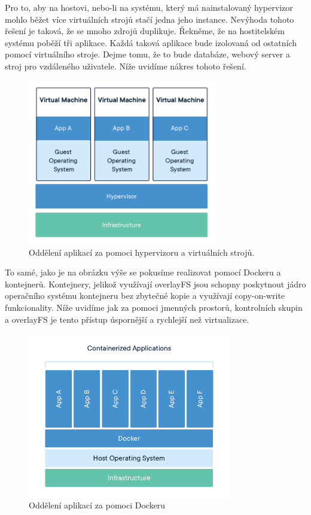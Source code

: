 Pro to, aby na hostovi, nebo-li na systému, který má nainstalovaný hypervizor mohlo běžet více virtuálních strojů stačí jedna jeho instance. Nevýhoda tohoto řešení je taková, že se mnoho zdrojů duplikuje. Řekněme, že na hostitelském systému poběží tři aplikace. Každá taková aplikace bude izolovaná od ostatních pomocí virtuálního stroje. Dejme tomu, že to bude databáze, webový server a stroj pro vzdáleného uživatele. Níže uvidíme nákres tohoto řešení. 

\begin{figure}[!h]
	\centering
	\includegraphics[width=0.73\textwidth, angle=0]{docker-VM.png}
	\caption[Docker VM]{Oddělení aplikací za pomoci hypervizoru a virtuálních strojů.}
	\label{fig:docker-vm}
\end{figure}

To samé, jako je na obrázku výše se pokusíme realizovat pomocí Dockeru a kontejnerů. Kontejnery, jelikož využívají overlayFS jsou schopny poskytnout jádro operačního systému kontejneru bez zbytečné kopie a využívají copy-on-write funkcionality. Níže uvidíme jak za pomoci jmenných prostorů, kontrolních skupin a overlayFS je tento přístup úspornější a rychlejší než virtualizace. 


\begin{figure}[!h]
	\centering
	\includegraphics[width=0.8\textwidth, angle=0]{docker-docker.png}
	\caption[Docker kontejnery]{Oddělení aplikací za pomoci Dockeru}
	\label{fig:docker-docker}
\end{figure}

